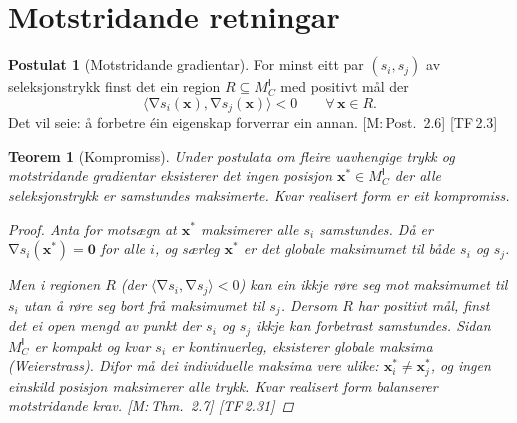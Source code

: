 \documentclass[10pt]{book}
\theoremstyle{definition}
\newtheorem{postulat}[definisjon]{Postulat}
\theoremstyle{plain}
\newtheorem{teorem}[definisjon]{Teorem}
\theoremstyle{remark}
\newcommand{\MC}{M^{\mathsf{I}}_C}
\newcommand{\inner}[2]{\langle #1, #2 \rangle}
\DeclareMathOperator{\grad}{\nabla}
\newcommand{\TF}[1]{\textnormal{[TF\,#1]}}
\newcommand{\Mref}[1]{\textnormal{[M:\,#1]}}
\begin{document}
\section{Motstridande retningar}\label{sec:seleksjon:motstr}

\begin{postulat}[Motstridande gradientar]\label{post:motstr}
For minst eitt par $(s_i, s_j)$ av seleksjonstrykk finst det ein region $R \subseteq \MC$ med positivt m\aa l der
\[
  \inner{\grad s_i(\bm{x})}{\grad s_j(\bm{x})} < 0 \qquad \forall\, \bm{x} \in R.
\]
Det vil seie: \aa{} forbetre \'ein eigenskap forverrar ein annan. \Mref{Post.~2.6} \TF{2.3}
\end{postulat}

\begin{teorem}[Kompromiss]\label{thm:kompromiss}
Under postulata om fleire uavhengige trykk og motstridande gradientar eksisterer det ingen posisjon $\bm{x}^* \in \MC$ der alle seleksjonstrykk er samstundes maksimerte. Kvar realisert form er eit \emph{kompromiss}.

\begin{proof}
Anta for mots\ae gn at $\bm{x}^*$ maksimerer alle $s_i$ samstundes. D\aa{} er $\grad s_i(\bm{x}^*) = \bm{0}$ for alle $i$, og s\ae rleg $\bm{x}^*$ er det globale maksimumet til b\aa de $s_i$ og $s_j$.

Men i regionen $R$ (der $\inner{\grad s_i}{\grad s_j} < 0$) kan ein ikkje r\o re seg mot maksimumet til $s_i$ utan \aa{} r\o re seg bort fr\aa{} maksimumet til $s_j$. Dersom $R$ har positivt m\aa l, finst det ei open mengd av punkt der $s_i$ og $s_j$ ikkje kan forbetrast samstundes. Sidan $\MC$ er kompakt og kvar $s_i$ er kontinuerleg, eksisterer globale maksima (Weierstrass). Difor m\aa{} dei individuelle maksima vere ulike: $\bm{x}_i^* \neq \bm{x}_j^*$, og ingen einskild posisjon maksimerer alle trykk. Kvar realisert form balanserer motstridande krav. \Mref{Thm.~2.7} \TF{2.31}
\end{proof}
\end{teorem}
\end{document}
